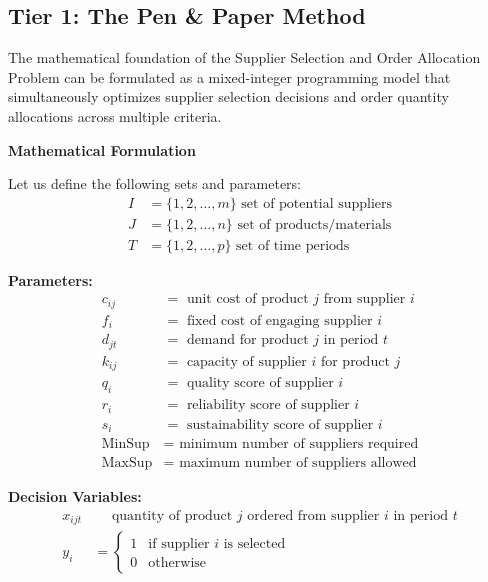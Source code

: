 \documentclass{article}
\begin{document}
\subsection{Tier 1: The Pen \& Paper Method}

The mathematical foundation of the Supplier Selection and Order Allocation Problem can be formulated as a mixed-integer programming model that simultaneously optimizes supplier selection decisions and order quantity allocations across multiple criteria.

\textbf{Mathematical Formulation}

Let us define the following sets and parameters:
\begin{align}
I &= \{1, 2, \ldots, m\} \text{ set of potential suppliers} \\
J &= \{1, 2, \ldots, n\} \text{ set of products/materials} \\
T &= \{1, 2, \ldots, p\} \text{ set of time periods}
\end{align}

\textbf{Parameters:}
\begin{align}
c_{ij} &= \text{ unit cost of product } j \text{ from supplier } i \\
f_i &= \text{ fixed cost of engaging supplier } i \\
d_{jt} &= \text{ demand for product } j \text{ in period } t \\
k_{ij} &= \text{ capacity of supplier } i \text{ for product } j \\
q_{i} &= \text{ quality score of supplier } i \\
r_{i} &= \text{ reliability score of supplier } i \\
s_{i} &= \text{ sustainability score of supplier } i \\
\text{MinSup} &= \text{ minimum number of suppliers required} \\
\text{MaxSup} &= \text{ maximum number of suppliers allowed}
\end{align}

\textbf{Decision Variables:}
\begin{align}
x_{ijt} &\quad \text{ quantity of product } j \text{ ordered from supplier } i \text{ in period } t \\
y_i &= \begin{cases} 
1 & \text{if supplier } i \text{ is selected} \\
0 & \text{otherwise}
\end{cases}
\end{align}
\end{document}
